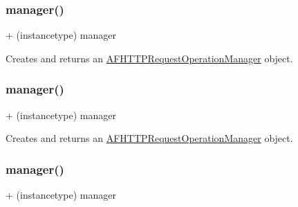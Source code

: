\subsubsection{\texorpdfstring{manager()}{manager()}\hspace{0.1cm}{\footnotesize\ttfamily [1/3]}}
{\footnotesize\ttfamily + (instancetype) manager \begin{DoxyParamCaption}{ }\end{DoxyParamCaption}}

Creates and returns an {\ttfamily \mbox{\hyperlink{interface_a_f_h_t_t_p_request_operation_manager}{A\+F\+H\+T\+T\+P\+Request\+Operation\+Manager}}} object. \mbox{\label{interface_a_f_h_t_t_p_request_operation_manager_a754dc33037c729c5ef6a34b12de6884a}} 
\subsubsection{\texorpdfstring{manager()}{manager()}\hspace{0.1cm}{\footnotesize\ttfamily [2/3]}}
{\footnotesize\ttfamily + (instancetype) manager \begin{DoxyParamCaption}{ }\end{DoxyParamCaption}}

Creates and returns an {\ttfamily \mbox{\hyperlink{interface_a_f_h_t_t_p_request_operation_manager}{A\+F\+H\+T\+T\+P\+Request\+Operation\+Manager}}} object. \mbox{\label{interface_a_f_h_t_t_p_request_operation_manager_a754dc33037c729c5ef6a34b12de6884a}} 
\subsubsection{\texorpdfstring{manager()}{manager()}\hspace{0.1cm}{\footnotesize\ttfamily [3/3]}}
{\footnotesize\ttfamily + (instancetype) manager \begin{DoxyParamCaption}{ }\end{DoxyParamCaption}}


